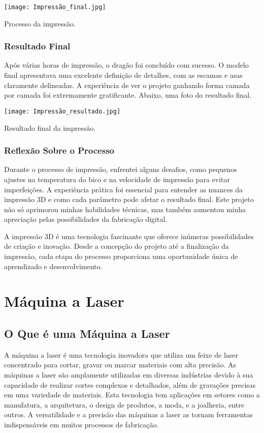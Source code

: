 \documentclass[
]{book}
\begin{document}
\texttt{[image: Impressão\_final.jpg]}

Processo da impressão.

\subsection{Resultado Final}\label{resultado-final}

Após várias horas de impressão, o dragão foi concluído com sucesso. O modelo final apresentava uma excelente definição de detalhes, com as escamas e asas claramente delineadas. A experiência de ver o projeto ganhando forma camada por camada foi extremamente gratificante. Abaixo, uma foto do resultado final.

\texttt{[image: Impressão\_resultado.jpg]}

Resultado final da impressão.

\subsection{Reflexão Sobre o Processo}\label{reflexuxe3o-sobre-o-processo}

Durante o processo de impressão, enfrentei alguns desafios, como pequenos ajustes na temperatura do bico e na velocidade de impressão para evitar imperfeições. A experiência prática foi essencial para entender as nuances da impressão 3D e como cada parâmetro pode afetar o resultado final. Este projeto não só aprimorou minhas habilidades técnicas, mas também aumentou minha apreciação pelas possibilidades da fabricação digital.

A impressão 3D é uma tecnologia fascinante que oferece inúmeras possibilidades de criação e inovação. Desde a concepção do projeto até a finalização da impressão, cada etapa do processo proporciona uma oportunidade única de aprendizado e desenvolvimento.

\chapter{Máquina a Laser}\label{muxe1quina-a-laser}

\section{O Que é uma Máquina a Laser}\label{o-que-uxe9-uma-muxe1quina-a-laser}

A máquina a laser é uma tecnologia inovadora que utiliza um feixe de laser concentrado para cortar, gravar ou marcar materiais com alta precisão. As máquinas a laser são amplamente utilizadas em diversas indústrias devido à sua capacidade de realizar cortes complexos e detalhados, além de gravações precisas em uma variedade de materiais. Esta tecnologia tem aplicações em setores como a manufatura, a arquitetura, o design de produtos, a moda, e a joalheria, entre outros. A versatilidade e a precisão das máquinas a laser as tornam ferramentas indispensáveis em muitos processos de fabricação.
\end{document}
